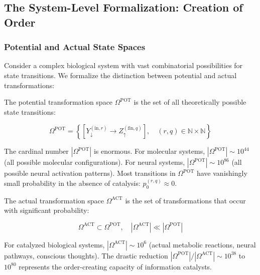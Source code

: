 \subsection{The System-Level Formalization: Creation of Order}

\subsubsection{Potential and Actual State Spaces}

Consider a complex biological system with vast combinatorial possibilities for state transitions. We formalize the distinction between potential and actual transformations:

\begin{definition}
The potential transformation space \(\Omega^{\text{POT}}\) is the set of all theoretically possible state transitions:

\begin{equation}
\Omega^{\text{POT}} = \left\{ \left[Y_{\downarrow}^{(\text{in},r)} \to Z_{\uparrow}^{(\text{fin},q)}\right], \quad (r,q) \in \mathbb{N} \times \mathbb{N} \right\}
\end{equation}

The cardinal number \(|\Omega^{\text{POT}}|\) is enormous. For molecular systems, \(|\Omega^{\text{POT}}| \sim 10^{44}\) (all possible molecular configurations). For neural systems, \(|\Omega^{\text{POT}}| \sim 10^{86}\) (all possible neural activation patterns). Most transitions in \(\Omega^{\text{POT}}\) have vanishingly small probability in the absence of catalysis: \(p_{0}^{(r,q)} \approx 0\).
\end{definition}

\begin{definition}
The actual transformation space \(\Omega^{\text{ACT}}\) is the set of transformations that occur with significant probability:

\begin{equation}
\Omega^{\text{ACT}} \subset \Omega^{\text{POT}}, \quad |\Omega^{\text{ACT}}| \ll |\Omega^{\text{POT}}|
\end{equation}

For catalyzed biological systems, \(|\Omega^{\text{ACT}}| \sim 10^{6}\) (actual metabolic reactions, neural pathways, conscious thoughts). The drastic reduction \(|\Omega^{\text{POT}}|/|\Omega^{\text{ACT}}| \sim 10^{38}\) to \(10^{80}\) represents the order-creating capacity of information catalysts.
\end{definition}

